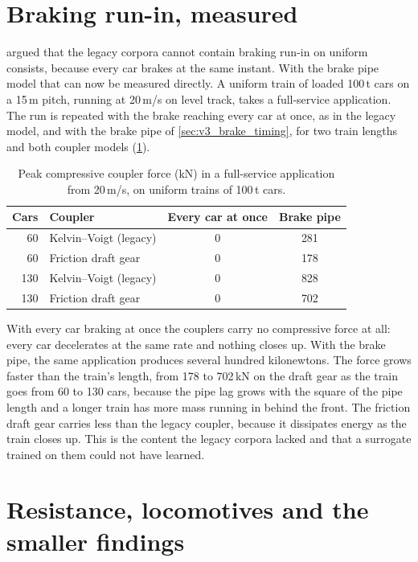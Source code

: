 \section{Braking run-in, measured}
\label{sec:v3_run_in}

 argued that the legacy corpora cannot contain braking run-in on uniform consists, because every car brakes at the same instant. With the brake pipe model that can now be measured directly. A uniform train of loaded 100\,t cars on a 15\,m pitch, running at 20\,m/s on level track, takes a full-service application. The run is repeated with the brake reaching every car at once, as in the legacy model, and with the brake pipe of \cref{sec:v3_brake_timing}, for two train lengths and both coupler models (\cref{tab:v3_run_in}).

\begin{table}[htbp]
    \centering
    \small
    \begin{tabular}{rlcc}
        \toprule
        Cars & Coupler & Every car at once & Brake pipe \\
        \midrule
        60  & Kelvin--Voigt (legacy) & 0 & 281 \\
        60  & Friction draft gear    & 0 & 178 \\
        130 & Kelvin--Voigt (legacy) & 0 & 828 \\
        130 & Friction draft gear    & 0 & 702 \\
        \bottomrule
    \end{tabular}
    \caption{Peak compressive coupler force (kN) in a full-service application from 20\,m/s, on uniform trains of 100\,t cars.}
    \label{tab:v3_run_in}
\end{table}

With every car braking at once the couplers carry no compressive force at all: every car decelerates at the same rate and nothing closes up. With the brake pipe, the same application produces several hundred kilonewtons. The force grows faster than the train's length, from 178 to 702\,kN on the draft gear as the train goes from 60 to 130 cars, because the pipe lag grows with the square of the pipe length and a longer train has more mass running in behind the front. The friction draft gear carries less than the legacy coupler, because it dissipates energy as the train closes up. This is the content the legacy corpora lacked and that a surrogate trained on them could not have learned.

\section{Resistance, locomotives and the smaller findings}
\label{sec:v3_findings}

